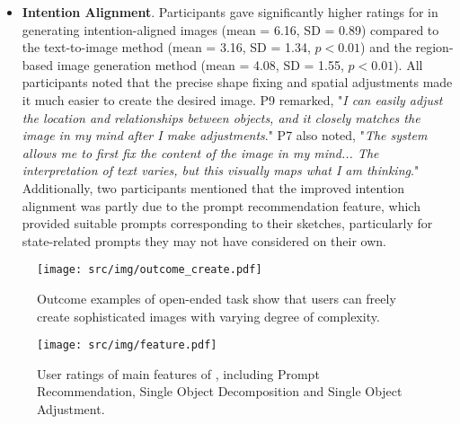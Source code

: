 \begin{itemize}
    \item \textbf{Intention Alignment}.
    Participants gave significantly higher ratings for \tool in generating intention-aligned images (mean = 6.16, SD = 0.89) compared to the text-to-image method (mean = 3.16, SD = 1.34, $p<0.01$) and the region-based image generation method (mean = 4.08, SD = 1.55, $p<0.01$). 
    All participants noted that the precise shape fixing and spatial adjustments made it much easier to create the desired image.
    P9 remarked, "\emph{I can easily adjust the location and relationships between objects, and it closely matches the image in my mind after I make adjustments}." P7 also noted, "\emph{The system allows me to first fix the content of the image in my mind... The interpretation of text varies, but this visually maps what I am thinking}."
    Additionally, two participants mentioned that the improved intention alignment was partly due to the prompt recommendation feature, which provided suitable prompts corresponding to their sketches, particularly for state-related prompts they may not have considered on their own.
\end{itemize}

\begin{figure*}[t]
    \centering
    \texttt{[image: src/img/outcome\_create.pdf]}
    \vspace{-3mm}
    \caption{Outcome examples of open-ended task show that users can freely create sophisticated images with varying degree of complexity.}
    \label{fig:outcome_task2}
\end{figure*}

\begin{figure*}[t]
    \centering
    \texttt{[image: src/img/feature.pdf]}
    \vspace{-2mm}
    \caption{User ratings of main features of \tool, including Prompt Recommendation, Single Object Decomposition and Single Object Adjustment.}
    \label{fig:feature}
\end{figure*}


